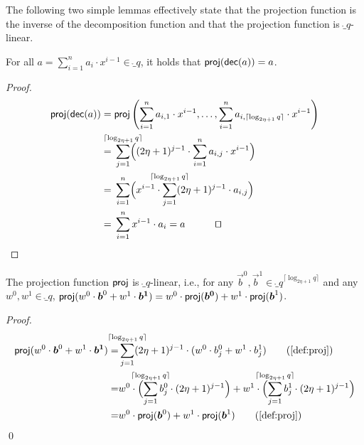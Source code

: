 The following two simple lemmas effectively state that the projection function is the inverse of the decomposition function and that the projection function is $\ring_q$-linear.
\begin{lemma}\label{lem:projinvofbin}
  For all $a = \sum_{i=1}^{n} a_i\cdot x^{i-1} \in\ring_q$, it holds that $\mathsf{proj}(\mathsf{dec}(a))=a$.
\end{lemma}
\begin{proof}
    \begin{align*}
      \proj(\decomp(a)) ={}& \proj\left(\sum_{i=1}^{n} a_{i,1}\cdot x^{i-1}, \dots, \sum_{i=1}^{n} a_{i,\lceil\log_{2\eta+1} q\rceil}\cdot x^{i-1}\right)\\
      ={}& \smashoperator{\sum_{j=1}^{\lceil\log_{2\eta+1} q\rceil}} \Bigl((2\eta+1)^{j-1} \cdot \sum_{i=1}^{n} a_{i,j}\cdot x^{i-1}\Bigr)\\
      ={}& \sum_{i=1}^{n} \Bigl(x^{i-1}\cdot \smashoperator{\sum_{j=1}^{\lceil\log_{2\eta+1} q\rceil}} (2\eta+1)^{j-1} \cdot a_{i,j}\Bigr)\\
      ={}& \sum_{i=1}^{n} x^{i-1}\cdot a_i=a\tag*{\qed}
    \end{align*}
\end{proof}
  

\begin{lemma}\label{lem:projislin}
  The projection function $\mathsf{proj}$ is $\ring_q$-linear, i.e., for any $\vec{b}^0,\vec{b}^1 \in \ring_q^{\lceil\log_{2\eta+1} q\rceil}$ and any $w^0,w^1 \in \ring_q$, $\mathsf{proj}(w^0\cdot\boldsymbol{b}^0+w^1\cdot\boldsymbol{b^1}) = w^0\cdot\mathsf{proj}(\boldsymbol{b^0}) + w^1\cdot\mathsf{proj}(\boldsymbol{b}^1)$.
\end{lemma}
\begin{proof}
  \begin{align*}
    \vspace{-1cm}
    \proj(w^0\cdot\vec{b}^0+w^1\cdot\vec{b^1})
    =&\smashoperator{\sum_{j=1}^{\lceil\log_{2\eta+1} q\rceil}} (2\eta+1)^{j-1}\cdot (w^0\cdot b^0_j+w^1\cdot b^1_j)\tag{\autoref{def:proj}}\\
    =&w^0\cdot \Bigl(\smashoperator{\sum_{j=1}^{\lceil\log_{2\eta+1} q\rceil}} b^0_j\cdot (2\eta+1)^{j-1}\Bigr) + w^1\cdot\Bigl( \smashoperator{\sum_{j=1}^{\lceil\log_{2\eta+1} q\rceil}} b^1_j\cdot (2\eta+1)^{j-1}\Bigr)\\
    =&w^0\cdot \proj(\vec{b}^0) + w^1\cdot\proj(\vec{b}^1)\tag{\autoref{def:proj}}
  \end{align*}
  \qed
\end{proof}


